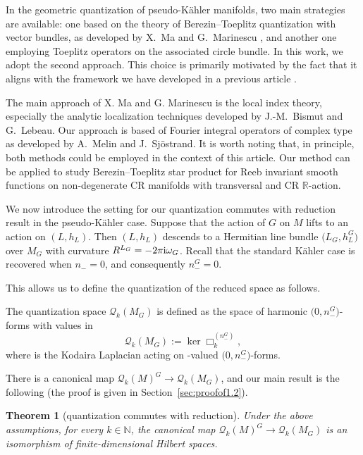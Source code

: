 \documentclass[pdftex]{sigma}
\numberwithin{equation}{section}
\newtheorem{Theorem}{Theorem}[section]
\begin{document}
In the geometric quantization of pseudo-K\"ahler manifolds, two main strategies are available: one based on the theory of Berezin--Toeplitz quantization with vector bundles, as developed by X.~Ma and G.~Marinescu \cite{mm}, and another one employing Toeplitz operators on the associated circle bundle. In this work, we adopt the second approach. This choice is primarily motivated by the fact that it aligns with the framework we have developed in a previous article \cite{gh}.
	 	
The main approach of X. Ma and G. Marinescu is the local index theory, especially the analytic localization techniques developed by J.-M.~Bismut and G.~Lebeau. Our approach is based of Fourier integral operators of complex type as developed by A.~Melin and J.~Sj\"ostrand. It is worth noting that, in principle, both methods could be employed in the context of this article. Our method can be applied to study Berezin--Toeplitz star product for Reeb invariant smooth functions on non-degenerate CR manifolds with transversal and CR $\mathbb R$-action.

We now introduce the setting for our quantization commutes with reduction result in the pseudo-K\"ahler case. Suppose that the action of $G$ on $M$ lifts to an action on $(L, h_L)$. Then $(L, h_L)$ descends to a Hermitian line bundle $\bigl(L_G, h_L^G\bigr)$ over $M_G$ with curvature $R^{L_G} = -2\pi {\rm i} \omega_G$.
	Recall that the standard K\"ahler case is recovered when $n_-=0$, and consequently $n_-^G=0$.
		
This allows us to define the quantization of the reduced space as follows.
		
\begin{Definition}
The quantization space $\mathcal{Q}_k(M_G)$ is defined as the space of harmonic $\bigl(0,n_-^G\bigr)$-forms with values in 
\[
\mathcal{Q}_k(M_G) := \ker \Box_k^{(n_-^G)},
\]
where  is the Kodaira Laplacian acting on -valued $\bigl(0,n_-^G\bigr)$-forms.
		\end{Definition}
		
There is a canonical map $\mathcal{Q}_k(M)^G \to \mathcal{Q}_k(M_G)$, and our main result is the following (the proof is given in Section~\ref{sec:proofof1.2}).
		
\begin{Theorem}[quantization commutes with reduction]\label{thm:qr=0}
Under the above assumptions, for every $k \in \mathbb{N}$, the canonical map
$\mathcal{Q}_k(M)^G \longrightarrow \mathcal{Q}_k(M_G)$ is an isomorphism of finite-dimensional Hilbert spaces.
\end{Theorem}
	
\end{document}
